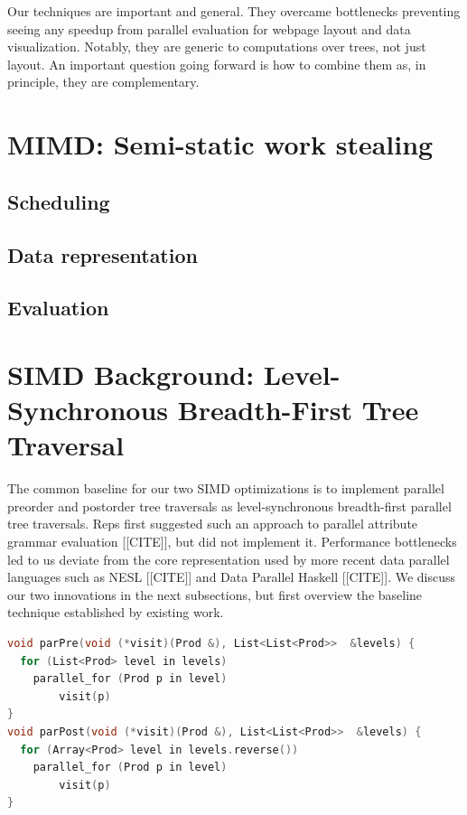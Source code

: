 Our techniques are important and general. They overcame bottlenecks preventing seeing any speedup from parallel evaluation for webpage layout and data visualization. Notably, they are generic to computations over trees, not just layout. An important question going forward is how to combine them as, in principle, they are complementary.

\section{MIMD: Semi-static work stealing}
\subsection{Scheduling}
\subsection{Data representation}
\subsection{Evaluation}


\section{SIMD Background: Level-Synchronous Breadth-First Tree Traversal}
The common baseline for our two SIMD optimizations is to implement parallel preorder and postorder tree traversals as level-synchronous breadth-first parallel tree traversals. Reps first suggested such an approach to parallel attribute grammar evaluation [[CITE]], but did not implement it. Performance bottlenecks led to us deviate from the core representation used by more recent data parallel languages such as NESL [[CITE]] and Data Parallel Haskell [[CITE]]. We discuss our two innovations in the next subsections, but first overview the baseline technique established by existing work.

\newsavebox{\bfsVisitor}
\begin{lrbox}{\bfsVisitor}%
\begin{lstlisting}[mathescape,language=C++,morekeywords={spawn,join,reverse,parallel_for}]
void parPre(void (*visit)(Prod &), List<List<Prod>>  &levels) {
  for (List<Prod> level in levels)
  	parallel_for (Prod p in level)
		visit(p)
}
void parPost(void (*visit)(Prod &), List<List<Prod>>  &levels) {
  for (Array<Prod> level in levels.reverse())
  	parallel_for (Prod p in level)
		visit(p)
}\end{lstlisting}
\end{lrbox}

